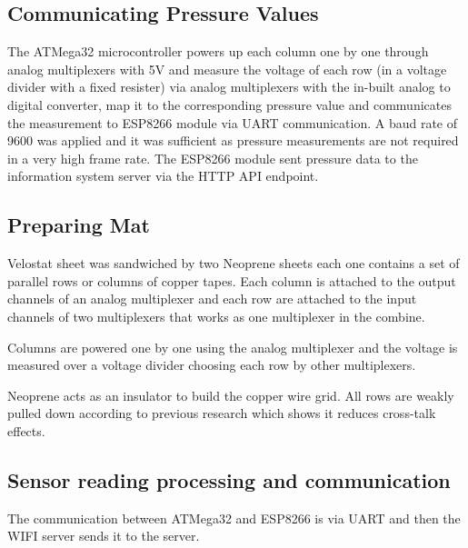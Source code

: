 \subsection{Communicating Pressure Values} 

The ATMega32 microcontroller powers up each column one by one through analog multiplexers with 5V and measure the voltage of each row (in a voltage divider with a fixed resister) via analog multiplexers with the in-built analog to digital converter, map it to the corresponding pressure value and communicates the measurement to ESP8266 module via UART communication. A baud rate of 9600 was applied and it was sufficient as pressure measurements are not required in a very high frame rate. The ESP8266 module sent pressure data to the information system server via the HTTP API endpoint.


\subsection{Preparing Mat}

Velostat sheet was sandwiched by two Neoprene sheets each one contains a set of parallel rows or columns of copper tapes. Each column is attached to the output channels of an analog multiplexer and each row are attached to the input channels of two multiplexers that works as one multiplexer in the combine. 



Columns are powered one by one using the analog multiplexer and the voltage is measured over a voltage divider choosing each row by other multiplexers. 

Neoprene acts as an insulator to build the copper wire grid. All rows are weakly pulled down according to previous research which shows it reduces cross-talk effects.

\subsection{Sensor reading processing and communication}
The communication between ATMega32 and ESP8266 is via UART and then the WIFI server sends it to the server. 






